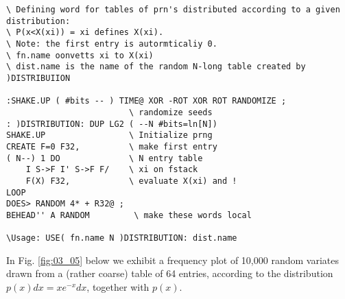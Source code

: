 \begin{lstlisting}
\ Defining word for tables of prn's distributed according to a given distribution:
\ P(x<X(xi)) = xi defines X(xi).
\ Note: the first entry is autormticaliy 0.  
\ fn.name oonvetts xi to X(xi) 
\ dist.name is the name of the random N-long table created by )DISTRIBUIION

:SHAKE.UP ( #bits -- ) TIME@ XOR -ROT XOR ROT RANDOMIZE ;
                         \ randomize seeds
: )DISTRIBUTION: DUP LG2 ( --N #bits=ln[N])
SHAKE.UP                 \ Initialize prng
CREATE F=0 F32,          \ make first entry
( N--) 1 DO              \ N entry table
    I S->F I' S->F F/    \ xi on fstack
    F(X) F32,            \ evaluate X(xi) and !
LOOP
DOES> RANDOM 4* + R32@ ;
BEHEAD'' A RANDOM         \ make these words local

\Usage: USE( fn.name N )DISTRIBUTION: dist.name
\end{lstlisting}
In Fig. \ref{fig:03_05} below we exhibit a frequency plot of 10,000 random
variates drawn from a (rather coarse) table of 64 entries, according to the
distribution $p(x)dx=xe^{-x}dx$, together with $p(x)$.

